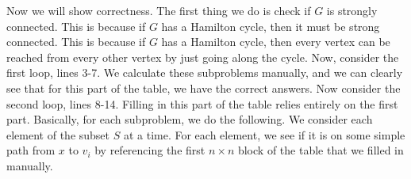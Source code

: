 \documentclass{article}
\begin{document}
Now we will show correctness. The first thing we do is check if $G$ is
strongly connected. This is because if $G$ has a Hamilton cycle, then
it must be strong connected. This is because if $G$ has a Hamilton cycle, then
every vertex can be reached from every other vertex by just going along the
cycle. Now, consider the first loop, lines 3-7. We calculate
these subproblems manually, and we can clearly see that for this part of the
table, we have the correct answers. Now consider the second loop, lines 8-14.
Filling in this part of the table relies entirely on the first part. Basically,
for each subproblem, we do the following. We consider each element of the subset
$S$ at a time. For each element, we see if it is on some simple path from $x$ to
$v_i$ by referencing the first $n \times n$ block of the table that we filled in
manually.

\newpage
\end{document}

